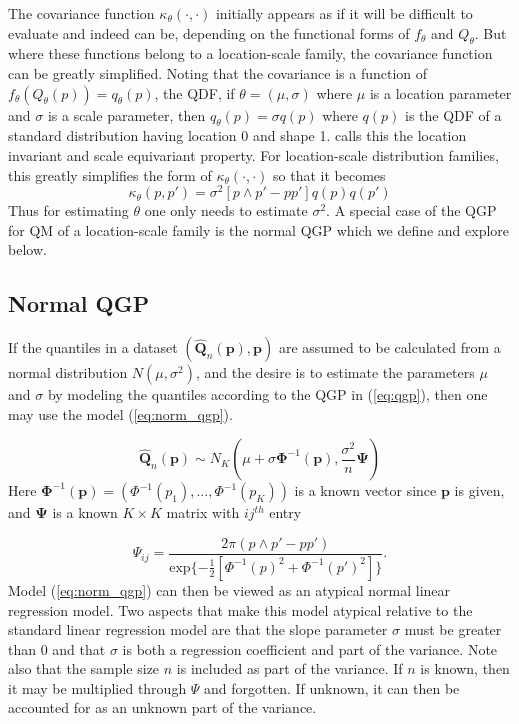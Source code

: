 \documentclass[preprint,12pt,authoryear]{elsarticle}
\newcommand{\1}[1]{\mathds{1}\left[#1\right]}
\begin{document}
The covariance function $\kappa_{\theta} (\cdot, \cdot)$ initially appears as 
if it will be difficult to evaluate and indeed can be, depending on the 
functional forms of $f_{\theta}$ and $Q_{\theta}$. But where these functions 
belong to a location-scale family, the covariance function can be greatly 
simplified. 
Noting that the covariance is a function of $f_{\theta}(Q_{\theta}(p)) = q_{\theta}(p)$, the QDF, if $\theta = (\mu, \sigma)$ where $\mu$ is a location parameter and $\sigma$ is a scale parameter, then $q_{\theta}(p) = \sigma q(p)$ where $q(p)$ is the QDF of a standard distribution having location 0 and shape 1. \cite{staudte2017shapes} calls this the location invariant and scale equivariant property. For location-scale distribution families, this greatly simplifies the form of $\kappa_{\theta}(\cdot,\cdot)$ so that it becomes
\[
    \kappa_{\theta}(p, p') = \sigma^{2}[p\wedge p' - p p'] q(p)q(p') 
\] 
Thus for estimating $\theta$ one only needs to estimate $\sigma^2$. A special 
case of the QGP for QM of a location-scale family is the normal QGP which we 
define and explore below.


\subsection{Normal QGP}

If the quantiles in a dataset 
$(\hat{\boldsymbol{Q}}_n(\boldsymbol{p}),\boldsymbol{p})$ are assumed to be 
calculated from a normal distribution $N(\mu, \sigma^2)$, and the desire is to 
estimate the parameters $\mu$ and $\sigma$ by modeling the quantiles according 
to the QGP in (\ref{eq:qgp}), then one may use the model (\ref{eq:norm_qgp}). 

\begin{equation}
    \label{eq:norm_qgp}
\hat{\boldsymbol{Q}}_n(\boldsymbol{p}) \sim N_K 
\left( \mu + \sigma \boldsymbol{\Phi}^{-1}(\boldsymbol{p}),\frac{\sigma^2}{n} 
\boldsymbol{\Psi} \right)
\end{equation}
Here $\boldsymbol{\Phi}^{-1}(\boldsymbol{p}) = (\Phi^{-1}(p_1), ..., 
\Phi^{-1}(p_K))$ is a known vector since $\boldsymbol{p}$ is given, and 
$\boldsymbol{\Psi}$ is a known $K\times K$ matrix with $ij^{th}$ entry

\[
    \Psi_{ij} = \frac{2 \pi (p\wedge p' - p p')}{\text{exp}\{-\frac{1}{2}[\Phi^{-1}(p)^2 + \Phi^{-1}(p')^2]\}}.
\]
Model (\ref{eq:norm_qgp}) can then be viewed as an atypical normal linear 
regression model. Two aspects that make this model atypical relative to the 
standard linear regression model are that the slope parameter $\sigma$ must be 
greater than 0 and that $\sigma$ is both a regression coefficient and part of 
the variance.
Note also that the sample size $n$ is included as part of the variance. If $n$ 
is known, then it may be multiplied through $\Psi$ and forgotten. If unknown, 
it can then be accounted for as an unknown part of the variance. 
\end{document}
